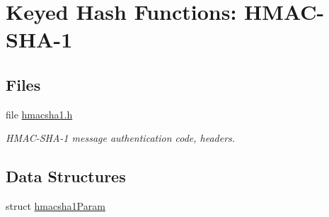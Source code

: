 \hypertarget{group__HMAC__sha1__m}{
\section{Keyed Hash Functions: HMAC-SHA-1}
\label{group__HMAC__sha1__m}
}
\subsection*{Files}
\begin{CompactItemize}
\item 
file \hyperlink{hmacsha1_8h}{hmacsha1.h}
\begin{CompactList}\small\item\em HMAC-SHA-1 message authentication code, headers. \item\end{CompactList}

\end{CompactItemize}
\subsection*{Data Structures}
\begin{CompactItemize}
\item 
struct \hyperlink{structhmacsha1Param}{hmacsha1Param}
\end{CompactItemize}
